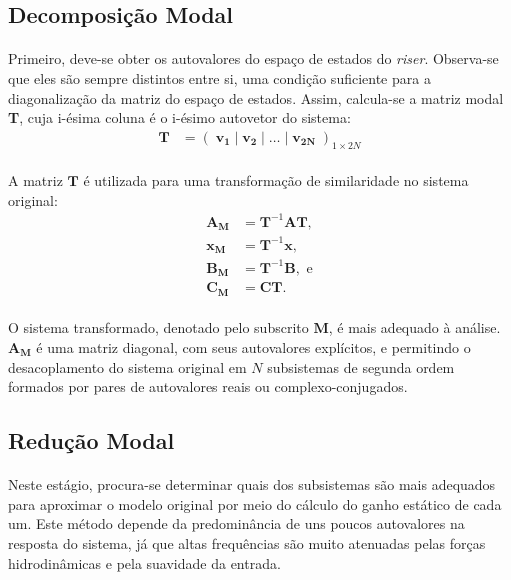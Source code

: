 \documentclass[a4paper,11pt]{scrartcl} %
\numberwithin{equation}{section} %
\numberwithin{figure}{section} %
\numberwithin{table}{section} %
\begin{document}
\subsection{Decomposição Modal}

\paragraph{} Primeiro, deve-se obter os autovalores do espaço de estados do \textit{riser}. Observa-se que eles são sempre distintos entre si, uma condição suficiente para a diagonalização da matriz do espaço de estados. Assim, calcula-se a matriz modal \textbf{T}, cuja i-ésima coluna é o i-ésimo autovetor do sistema: \begin{align}
	\mathbf{T} &= \left(\;\mathbf{v_1}\;|\;\mathbf{v_2}\;|\;\ldots\;|\;\mathbf{v_{2N}}\;\right)_{1\times 2N}
\end{align}

\paragraph{} A matriz $\mathbf{T}$ é utilizada para uma transformação de similaridade no sistema original: \begin{align}
	\mathbf{A_M} &= \mathbf{T}^{-1}\mathbf{A}\mathbf{T},\\
	\mathbf{x_M} &=\mathbf{T}^{-1}\mathbf{x},	\\
	\mathbf{B_M} &= \mathbf{T}^{-1}\mathbf{B},\textrm{ e}\\
	\mathbf{C_M} &=\mathbf{C}\mathbf{T}.
\end{align}

\paragraph{} O sistema transformado, denotado pelo subscrito $\mathbf{M}$, é mais adequado à análise. $\mathbf{A_M}$ é uma matriz diagonal, com seus autovalores explícitos, e permitindo o desacoplamento do sistema original em $N$ subsistemas de segunda ordem formados por pares de autovalores reais ou complexo-conjugados.


\subsection{Redução Modal}
\paragraph{} Neste estágio, procura-se determinar quais dos subsistemas são mais adequados para aproximar o modelo original por meio do cálculo do ganho estático de cada um. Este método depende da predominância de uns poucos autovalores na resposta do sistema, já que altas frequências são muito atenuadas pelas forças hidrodinâmicas e pela suavidade da entrada. 
\end{document}
